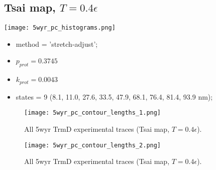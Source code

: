 \subsection{Tsai map, $T=0.4\epsilon$}
\label{subsec:5wyr-pc}
\begin{minipage}[c]{0.7\textwidth}
    \texttt{[image: 5wyr\_pc\_histograms.png]}
\end{minipage}
\hfill
\begin{minipage}[c]{0.45\textwidth}
    \begin{itemize}
        \item method = 'stretch-adjust';
        \item $p_{prot}=0.3745$
        \item $k_{prot}=0.0043$
        \item states = 9 (8.1, 11.0, 27.6, 33.5, 47.9, 68.1, 76.4, 81.4, 93.9 nm);
    \end{itemize}
\end{minipage}

\begin{figure}
    \centering
    \texttt{[image: 5wyr\_pc\_contour\_lengths\_1.png]}
    \caption{All 5wyr TrmD experimental traces (Tsai map, $T=0.4\epsilon$).}
    \label{fig:5wyr-pc-cl1}
\end{figure}

\begin{figure}
    \centering
    \texttt{[image: 5wyr\_pc\_contour\_lengths\_2.png]}
    \caption{All 5wyr TrmD experimental traces (Tsai map, $T=0.4\epsilon$).}
    \label{fig:5wyr-pc-cl2}
\end{figure}

